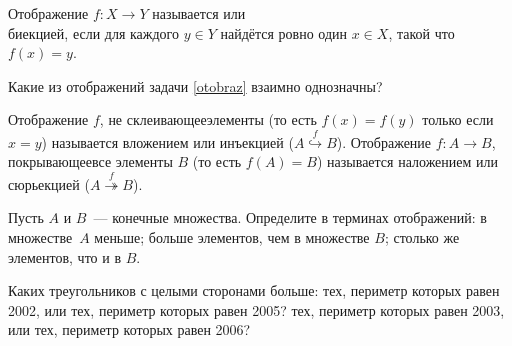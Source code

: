 \documentclass[a4paper,12pt]{article}
\begin{document}
\vspace{-5mm}









Отображение $f\colon X\to Y$ называется
 или \\ биекцией, если для каждого $y\in Y$ найдётся ровно
один $x\in X$, такой что $f(x)=y$.

Какие из отображений задачи \ref{otobraz} взаимно однозначны?



  Отображение $f$, не  склеивающее элементы (то есть $f(x)=f(y)$ только если $x=y$) называется  вложением или  инъекцией ($A\stackrel{f}{\hookrightarrow}B$). Отображение $f\colon A\to B$,  покрывающее все элементы $B$ (то есть $f(A)=B$) называется  наложением или  сюрьекцией ($A\stackrel{f}{\twoheadrightarrow}B$).

Пусть $A$ и $B$~--- конечные множества. Определите в терминах отображений: в множестве~$A$
 меньше;
 больше элементов, чем в множестве $B$;
 столько же элементов, что и в $B$.


Каких треугольников с целыми сторонами больше:
тех, периметр которых равен
2002, или тех, периметр которых равен 2005?
тех, периметр которых равен
2003, или тех, периметр которых равен 2006?
\end{document}
